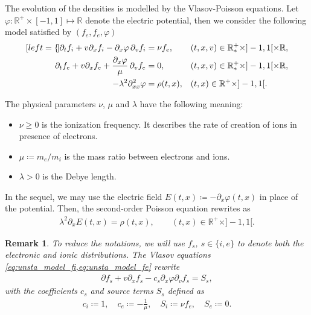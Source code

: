 \documentclass{article}
\newtheorem{remarque}{Remark}[section]
\numberwithin{equation}{section}
\newcommand{\R}{\mathbb{R}}
\newcommand{\mysubeq}[2]{ %
	\begin{subequations}\label{#1}
		\begin{align}[left = {\empheqlbrace}]
			#2
		\end{align}
	\end{subequations}	
}
\begin{document}
The evolution of the densities is modelled by the Vlasov-Poisson equations. Let $\varphi : \R^+ \times [-1,1] \mapsto \R$ denote the electric potential, then we consider the following model satisfied by $(f_e, f_e, \varphi)$ 
\mysubeq{eq:unsta_model}{
	\partial_t f_i + v \partial_x f_i - \partial_x \varphi \, \partial_v f_i &= \nu f_e, && (t,x,v) \in \R_{*}^{+} \times ]-1,1[ \times \R, \label{eq:unsta_model_fi} \\
	\partial_t f_e + v \partial_x f_e + \frac{\partial_x \varphi }{\mu}\, \partial_v f_e &= 0, \quad\quad && (t,x,v) \in \R_{*}^{+} \times ]-1,1[ \times \R, \label{eq:unsta_model_fe} \\
	- \lambda^2 \partial^2_{xx} \varphi &= \rho (t,x), && (t,x) \in \R^{+} \times ]-1,1[. \label{eq:unsta_model_phi}
}
The physical parameters $\nu$, $\mu$ and $\lambda$ have the following meaning:
\begin{itemize}
\item $\nu \geqslant 0$ is the ionization frequency. It describes the rate of creation %
of ions in presence of electrons.
\item $\mu \coloneqq m_e / m_i$ is the mass ratio between electrons and ions.
\item $\lambda > 0$ is the Debye length.
\end{itemize}
In the sequel, we may use the electric field $E(t,x) \coloneqq - \partial_x \varphi(t,x)$ in place of the potential. Then, the second-order Poisson equation rewrites as 
\begin{align}
	\lambda^2 \partial_x E (t,x) = \rho(t,x), \quad \quad (t,x) \in \R^{+} \times ]-1,1[. \label{eq:unsta_model_E}
\end{align}

\begin{remarque}
	To reduce the notations, we will use $f_s$, $s\in\{i,e\}$ to denote both the electronic and ionic distributions. The Vlasov equations \cref{eq:unsta_model_fi,eq:unsta_model_fe} rewrite 
	\begin{align*}
		\partial f_s + v \partial_x f_s - c_s \partial_x \varphi \partial_v f_s = S_s,
	\end{align*}
	with the coefficients $c_s$ and source terms $S_s$ defined as
	\begin{align*}
		c_i \coloneqq 1, \quad c_e \coloneqq -\frac{1}{\mu}, \quad S_i \coloneqq \nu f_e, \quad S_e \coloneqq 0.
	\end{align*}
\end{remarque}
\end{document}
